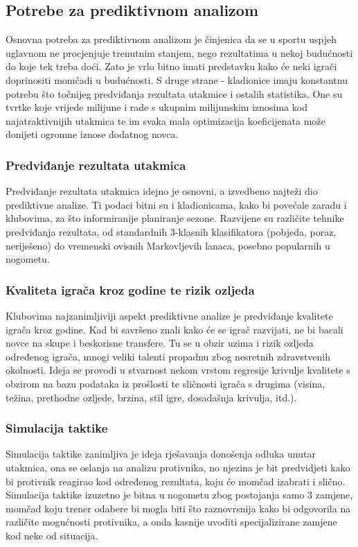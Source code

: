 \documentclass{ferseminar}
\begin{document}
\subsection{Potrebe za prediktivnom analizom}

Osnovna potreba za prediktivnom analizom je činjenica da se u sportu uspjeh uglavnom ne procjenjuje trenutnim stanjem, nego rezultatima u nekoj budućnosti do koje tek treba doći. Zato je vrlo bitno imati predstavku kako će neki igrači doprinositi momčadi u budućnosti.
\newline
S druge strane - kladionice imaju konstantnu potrebu što točnijeg predviđanja rezultata utakmice i ostalih statistika. One su tvrtke koje vrijede milijune i rade s ukupnim milijunskim iznosima kod najatraktivnijih utakmica te im svaka mala optimizacija koeficijenata može donijeti ogromne iznose dodatnog novca.

\subsubsection{Predviđanje rezultata utakmica}
Predviđanje rezultata utakmica idejno je osnovni, a izvedbeno najteži dio prediktivne analize. Ti podaci bitni su i kladionicama, kako bi povećale zaradu i klubovima, za što informiranije planiranje sezone. Razvijene su različite tehnike predviđanja rezultata, od standardnih 3-klasnih klasifikatora (pobjeda, poraz, neriješeno) do vremenski ovisnih Markovljevih lanaca, posebno popularnih u nogometu.

\subsubsection{Kvaliteta igrača kroz godine te rizik ozljeda}
Klubovima najzanimljiviji aspekt prediktivne analize je predviđanje kvalitete igrača kroz godine. Kad bi savršeno znali kako će se igrač razvijati, ne bi bacali novce na skupe i beskorisne transfere. Tu se u obzir uzima i rizik ozljeda određenog igrača, mnogi veliki talenti propadnu zbog nesretnih zdravstvenih okolnosti. Ideja se provodi u stvarnost nekom vrstom regresije krivulje kvalitete s obzirom na bazu podataka iz prošlosti te sličnosti igrača s drugima (visina, težina, prethodne ozljede, brzina, stil igre, dosadašnja krivulja, itd.).

\subsubsection{Simulacija taktike}
Simulacija taktike zanimljiva je ideja rješavanja donošenja odluka unutar utakmica, ona se oslanja na analizu protivnika, no njezina je bit predvidjeti kako bi protivnik reagirao kod određenog rezultata, koju će momčad izabrati i slično. Simulacija taktike izuzetno je bitna u nogometu zbog postojanja samo 3 zamjene, momčad koju trener odabere bi mogla biti što raznovrsnija kako bi odgovorila na različite mogućnosti protivnika, a onda kasnije uvoditi specijalizirane zamjene kod neke od situacija.
\end{document}
